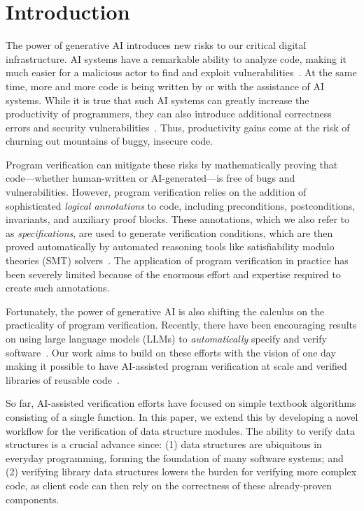 \section{Introduction}
\label{sec:intro}

The power of generative AI introduces new risks to our critical digital infrastructure.  AI systems have a remarkable ability to analyze code, making it much easier for a malicious actor to find and exploit vulnerabilities~\cite{BBB+23}.  At the same time, more and more code is being written by or with the assistance of AI systems.  While it is true that such AI systems can greatly increase the productivity of programmers, they can also introduce additional correctness errors and security vulnerabilities~\cite{insecure1,bug1}.  Thus, productivity gains come at the risk of churning out mountains of buggy, insecure code.

Program verification can mitigate these risks by mathematically proving that code---whether human-written or AI-generated---is free of bugs and vulnerabilities.
However, program verification relies on the addition of sophisticated \emph{logical annotations} to code, including preconditions, postconditions, invariants, and auxiliary proof blocks.  These annotations, which we also refer to as \emph{specifications}, are used to generate verification conditions, which are then proved automatically by automated reasoning tools like satisfiability modulo theories (SMT) solvers~\cite{BSST21}.
The application of program verification in practice has been severely limited because of the enormous effort and expertise required to create such annotations.

Fortunately, the power of generative AI is also shifting the calculus on the practicality of program verification.  Recently, there have been encouraging results on using large language models (LLMs) to \emph{automatically} specify and verify software~\cite{clover,cav24llm,autoverus,classinvgen,dafnysinglemethod}.
Our work aims to build on these efforts with the vision of one day making it possible to have AI-assisted program verification at scale and verified libraries of reusable code~\cite{verilib}.

So far, AI-assisted verification efforts have focused on simple textbook algorithms consisting of a single function.
In this paper, we extend this by developing a novel workflow for the verification of data structure modules. The ability to verify data structures is a crucial advance since: (1) data structures are ubiquitous in everyday programming, forming the foundation of many software systems; and (2) verifying library data structures lowers the burden for verifying more complex code, as client code can then rely on the correctness of these already-proven components.

